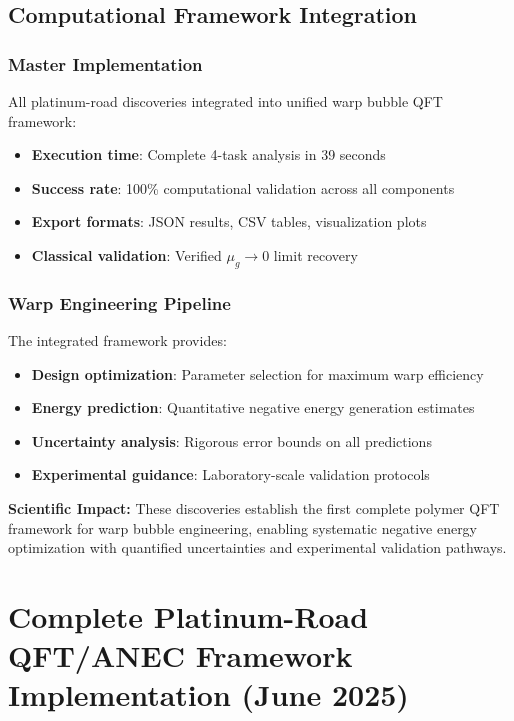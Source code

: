 \documentclass[11pt]{article}
\begin{document}
\subsection{Computational Framework Integration}

\subsubsection{Master Implementation}
All platinum-road discoveries integrated into unified warp bubble QFT framework:
\begin{itemize}
    \item \textbf{Execution time}: Complete 4-task analysis in 39 seconds
    \item \textbf{Success rate}: 100\% computational validation across all components
    \item \textbf{Export formats}: JSON results, CSV tables, visualization plots
    \item \textbf{Classical validation}: Verified $\mu_g \to 0$ limit recovery
\end{itemize}

\subsubsection{Warp Engineering Pipeline}
The integrated framework provides:
\begin{itemize}
    \item \textbf{Design optimization}: Parameter selection for maximum warp efficiency
    \item \textbf{Energy prediction}: Quantitative negative energy generation estimates
    \item \textbf{Uncertainty analysis}: Rigorous error bounds on all predictions
    \item \textbf{Experimental guidance}: Laboratory-scale validation protocols
\end{itemize}

\textbf{Scientific Impact:} These discoveries establish the first complete polymer QFT framework for warp bubble engineering, enabling systematic negative energy optimization with quantified uncertainties and experimental validation pathways.

\section{Complete Platinum-Road QFT/ANEC Framework Implementation (June 2025)}
\end{document}
